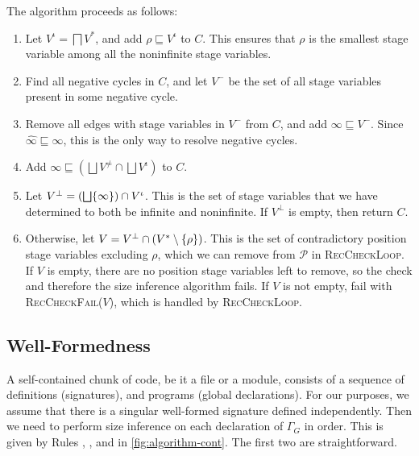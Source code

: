 \documentclass[acmsmall,nonacm,screen,review,anonymous,10pt]{acmart}
\begin{document}
The algorithm proceeds as follows:

\begin{enumerate}
    \item Let $V^\iota = \bigsqcap V^*$, and add $\rho \sqsubseteq V^\iota$ to $C$. This ensures that $\rho$ is the smallest stage variable among all the noninfinite stage variables.
    \item Find all negative cycles in $C$, and let $V^-$ be the set of all stage variables present in some negative cycle.
    \item Remove all edges with stage variables in $V^-$ from $C$, and add $\infty \sqsubseteq V^-$. Since $\widehat{\infty} \sqsubseteq \infty$, this is the only way to resolve negative cycles.
    \item Add $\infty \sqsubseteq \left(\bigsqcup V^\neq \cap \bigsqcup V^\iota\right)$ to $C$.
    \item Let $V^\bot = \left(\bigsqcup \{\infty\}\right) \cap V^\iota$. This is the set of stage variables that we have determined to both be infinite and noninfinite. If $V^\bot$ is empty, then return $C$.
    \item Otherwise, let $V = V^\bot \cap (V^* \setminus \{\rho\})$. This is the set of contradictory position stage variables excluding $\rho$, which we can remove from $\mathcal{P}$ in \textsc{RecCheckLoop}. If $V$ is empty, there are no position stage variables left to remove, so the check and therefore the size inference algorithm fails. If $V$ is not empty, fail with \textsc{RecCheckFail}($V$), which is handled by \textsc{RecCheckLoop}.
\end{enumerate}



\subsection{Well-Formedness}

A self-contained chunk of code, be it a file or a module, consists of a sequence of \coinductive definitions (signatures), and programs (global declarations). For our purposes, we assume that there is a singular well-formed signature defined independently. Then we need to perform size inference on each declaration of $\Gamma_G$ in order. This is given by Rules , , and  in \autoref{fig:algorithm-cont}. The first two are straightforward.
\end{document}
